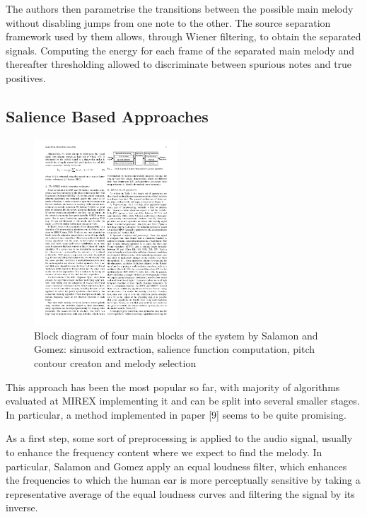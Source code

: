 The authors then parametrise the transitions between the possible main melody without disabling jumps from one note to the other. The source separation framework used by them allows, through Wiener filtering, to obtain the separated signals. Computing the energy for each frame of the separated main melody and thereafter thresholding allowed to discriminate between spurious notes and true positives.


\subsection{Salience Based Approaches}

\begin{figure}
  \vspace{-60pt}

  \begin{center}
    \includegraphics[width=0.48\textwidth]{Figures/salienceoveralldiagram}
  \end{center}
  \caption{Block diagram of four main blocks of the system by Salamon and Gomez: sinusoid extraction, salience function computation, pitch contour creaton and melody selection}
\end{figure}

This approach has been the most popular so far, with majority of algorithms evaluated at MIREX implementing it and can be split into several smaller stages. In particular, a method implemented in paper [9] seems to be quite promising.

As a first step, some sort of preprocessing is applied to the audio signal, usually to enhance the frequency content where we expect to find the melody. In particular, Salamon and Gomez apply an equal loudness filter, which enhances the frequencies to which the human ear is more perceptually sensitive by taking a representative average of the equal loudness curves and filtering the signal by its inverse. 

